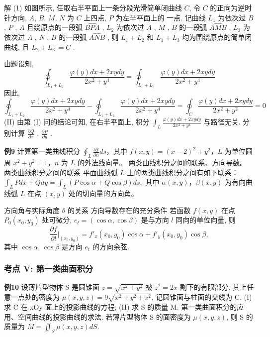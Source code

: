解 (1) 如图所示, 任取右半平面上一条分段光滑简单闭曲线 \(C\), 令 \(C\) 的正向为逆时针方向, \(A\), \(B\), \(M\), \(N\) 为 \(C\) 上四点, \(P\) 为左半平面上的 一点.
记曲线 \(L_{1}\) 为依次过 \(B\) , \(P\) , \(A\) 且绕原点的一段弧 \(\widehat{BPA}\) , \(L_{2}\) 为依次过 \(A\) , \(M\) , \(B\) 的一段弧 \(\widehat{AMB}\) , \(L_{3}\) 为依次过 \(A\) , \(N\) , \(B\) 的一段弧 \(\widehat{ANB}\) , 则 \(L_{1} + L_{2}\) 和 \(L_{1} + L_{3}\) 均为围绕原点的简单闭曲线, 且 \(L_{2} + L_{3}^{-} = C\) .

由题设知,
\[ \oint_{L_1+L_2} \frac{\varphi(y)dx + 2xy dy}{2x^2 + y^4} = \oint_{L_1+L_3} \frac{\varphi(y)dx + 2xy dy}{2x^2 + y^4} \]
因此,
\[ \oint_{L_1+L_2} \frac{\varphi(y)dx + 2xy dy}{2x^2 + y^4} - \oint_{L_1+L_3} \frac{\varphi(y)dx + 2xy dy}{2x^2 + y^4} = \oint_C \frac{\varphi(y)dx + 2xy dy}{2x^2 + y^2} = 0 \]
(II) 由第 (I) 问的结论可知, 在右半平面上, 积分 \(\int_L \frac{\varphi(y)dx + 2xy dy}{2x^2 + y^4}\) 与路径无关.
分别计算 \(\frac{\partial Q}{\partial x}\) , \(\frac{\partial P}{\partial y}\) .

\textbf{例9} 计算第一类曲线积分 \(\oint_{L} \frac{\partial f}{\partial n} ds\)，其中 \(f(x, y) = (x - 2)^2 + y^2\)，\(L\) 为单位圆周 \(x^2 + y^2 = 1\)，\(n\) 为 \(L\) 的外法线向量。 两类曲线积分之间的联系、方向导数。 两类曲线积分之间的联系 平面曲线弧 \(L\) 上的两类曲线积分之间有如下联系： \(\int_{L} Pdx + Qdy = \int_{L} (P \cos \alpha + Q \cos \beta) ds,\) 其中 \(\alpha(x, y)\)，\(\beta(x, y)\) 为有向曲线弧 \(L\) 在点 \((x, y)\) 处的切向量的方向角。

方向角与实际角度 \(\theta\) 的关系
方向导数存在的充分条件
若函数 \(f(x,y)\) 在点 \(P_0(x_0,y_0)\) 处可微分, \(e_t = (\cos \alpha, \cos \beta)\) 是与方向 \(l\) 同向的单位向量, 则
\[ \frac{\partial f}{\partial l} \bigg|_{(x_0, y_0)} = f'_x(x_0, y_0) \cos \alpha + f'_y(x_0, y_0) \cos \beta, \]
其中 \(\cos \alpha\), \(\cos \beta\) 是方向 \(e_t\) 的方向余弦.

\subsubsection*{考点 V: 第一类曲面积分}


\textbf{例10}
设薄片型物体 S 是圆锥面 \(z = \sqrt{x^2 + y^2}\) 被 \(z^2 = 2x\) 割下的有限部分, 其上任意一点处的密度为 \(\mu(x, y, z) = 9\sqrt{x^2 + y^2 + z^2}\), 记圆锥面与柱面的交线为 C.
(I) 求 C 在 xOy 面上的投影曲线的方程;
(II) 求 S 的质量 M.
第一类曲面积分的应用、空间曲线的投影曲线的求法.
若薄片型物体 S 的面密度为 \(\mu(x, y, z)\), 则 S 的质量为 \(M = \iint_S \mu(x, y, z) dS\).


